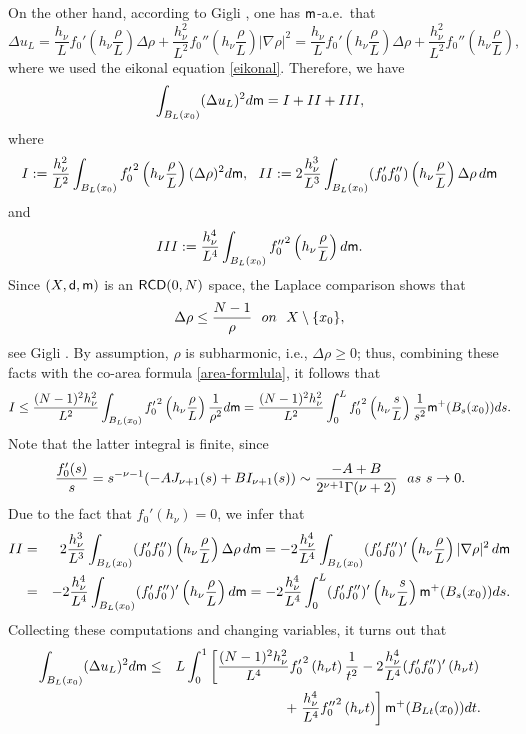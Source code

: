 \documentclass[11pt, reqno]{amsart}
\newcommand{\ds}{\displaystyle}
\numberwithin{equation}{section}
\begin{document}
		On the other hand, according to Gigli \cite[rel.\ (1.44)]{Gigli2}, one has ${\sf m}$-a.e.\ that
		$$\Delta u_L=\frac{h_\nu}{L}f_0'\left(h_\nu\frac{\rho}{L}\right)\Delta \rho+\frac{h_\nu^2}{L^2}f_0''\left(h_\nu\frac{\rho}{L}\right)|\nabla \rho|^2=\frac{h_\nu}{L}f_0'\left(h_\nu\frac{\rho}{L}\right)\Delta \rho+\frac{h_\nu^2}{L^2}f_0''\left(h_\nu\frac{\rho}{L}\right),$$ 
		where we used the eikonal equation \eqref{eikonal}. 
		 Therefore, we have
		\begin{eqnarray*}
			\int_{B_L(x_0)}(\Delta u_L)^2{\rm d}{\sf m}= I + II +III,
		\end{eqnarray*}
		where
		$$I:=\frac{h_\nu^2}{L^2}\int_{B_L(x_0)}{f_0'}^2\left(h_\nu\frac{\rho}{L}\right)(\Delta \rho)^2{\rm d}{\sf m},\ \ II:=2\frac{h_\nu^3}{L^3}\int_{B_L(x_0)}(f_0'f_0'')\left(h_\nu\frac{\rho}{L}\right)\Delta \rho\,{\rm d}{\sf m}$$
		and 
		$$III:=\frac{h_\nu^4}{L^4}\int_{B_L(x_0)}{f_0''}^2\left(h_\nu\frac{\rho}{L}\right){\rm d}{\sf m}.$$
		Since $(X,{\sf d},{\sf m})$ is an ${\sf RCD}(0,N)$ space, the Laplace comparison shows that $$\Delta\rho \leq \frac{N-1}{\rho}\ \  {\rm on}\ \  X\setminus \{x_0\},$$ see Gigli \cite[Corollary 5.15]{Gigli1}. By assumption,    $\rho$ is subharmonic, i.e., $\Delta\rho\geq 0$; thus, combining these facts with the co-area formula \eqref{area-formlula}, it follows that 
		$$I\leq \frac{(N-1)^2h_\nu^2}{L^2}\int_{B_L(x_0)}{f_0'}^2\left(h_\nu\frac{\rho}{L}\right)\frac{1}{\rho^2}{\rm d}{\sf m}=\frac{(N-1)^2h_\nu^2}{L^2}\int_0^L{f_0'}^2\left(h_\nu \frac{s}{L}\right)\frac{1}{s^2}{\sf m}^+(B_s(x_0)){\rm d}s.$$
		Note that the latter integral is finite, since $$\frac{f_0'(s)}{s}=s^{-\nu-1}(-AJ_{\nu+1}(s)+BI_{\nu+1}(s))\sim \frac{-A+B}{2^{\nu+1}\Gamma(\nu+2)}\ \ {\rm as}\ s\to 0.$$
		Due to the fact that $f_0'(h_\nu)=0$, we infer that 
		\begin{eqnarray*}
			II&=&2\frac{h_\nu^3}{L^3}\int_{B_L(x_0)}(f_0'f_0'')\left(h_\nu\frac{\rho}{L}\right)\Delta \rho\,{\rm d}{\sf m}=-2\frac{h_\nu^4}{L^4}\int_{B_L(x_0)}(f_0'f_0'')'\left(h_\nu\frac{\rho}{L}\right)|\nabla \rho|^2\,{\rm d}{\sf m}\\&=&-2\frac{h_\nu^4}{L^4}\int_{B_L(x_0)}(f_0'f_0'')'\left(h_\nu\frac{\rho}{L}\right){\rm d}{\sf m}=-2\frac{h_\nu^4}{L^4}\int_0^L(f_0'f_0'')'\left(h_\nu\frac{s}{L}\right){\sf m}^+(B_s(x_0)){\rm d}s.
		\end{eqnarray*}
		Collecting these computations and changing variables, it turns out that
		\begin{eqnarray*}
			\int_{B_L(x_0)}(\Delta u_L)^2{\rm d}{\sf m} &\leq& L \ds\int_0^1 \left[\frac{(N-1)^2h_\nu^2}{L^4}{f_0'}^2\left(h_\nu t\right)\frac{1}{t^2}-2\frac{h_\nu^4}{L^4}(f_0'f_0'')'\left(h_\nu t\right)\right.\\&& \qquad\quad  +\left.\frac{h_\nu^4}{L^4}{f_0''}^2\left(h_\nu t\right)\right]{\sf m}^+(B_{Lt}(x_0)){\rm d}t.  
		\end{eqnarray*}
\end{document}
